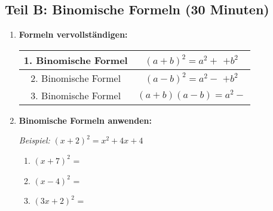 \subsection*{Teil B: Binomische Formeln (30 Minuten)}

\begin{enumerate}[label=\arabic*.,resume]

    \item \textbf{Formeln vervollständigen:}

    \begin{center}
        \begin{tabular}{|c|c|}
            \hline
            1. Binomische Formel & $(a + b)^2 = a^2 + $ \underline{\hspace{2cm}} $+ b^2$ \\[2ex]
            \hline
            2. Binomische Formel & $(a - b)^2 = a^2 - $ \underline{\hspace{2cm}} $+ b^2$ \\[2ex]
            \hline
            3. Binomische Formel & $(a + b)(a - b) = a^2 - $ \underline{\hspace{2cm}} \\[2ex]
            \hline
        \end{tabular}
    \end{center}

    \vspace{1cm}

    \item \textbf{Binomische Formeln anwenden:}

    \textit{Beispiel:} $(x + 2)^2 = x^2 + 4x + 4$

    \vspace{0.5cm}
    \begin{enumerate}[label=\alph*)]
        \item $(x + 7)^2$ = \underline{\hspace{6cm}}

        \vspace{0.8cm}

        \item $(x - 4)^2$ = \underline{\hspace{6cm}}

        \vspace{0.8cm}

        \item $(3x + 2)^2$ = \underline{\hspace{6cm}}

        \vspace{0.8cm}


\end{enumerate}
\end{enumerate}
